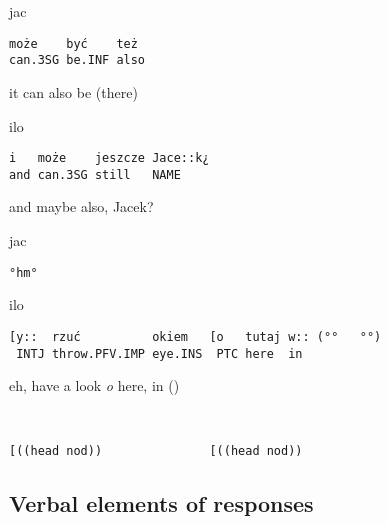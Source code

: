 \documentclass[output=paper]{langsci/langscibook}
\begin{document}
\vspace{2mm}
%
\begin{transbox}{1}{jac}
\begin{verbatim}
może    być    też
can.3SG be.INF also
\end{verbatim}
it can also be (there)
\end{transbox}
%
\begin{mdframednoverticalspace}[style=firstfoc]
\begin{transbox}{2}{ilo}
\begin{verbatim}
i   może    jeszcze Jace::k¿
and can.3SG still   NAME
\end{verbatim}
and maybe also, Jacek?
\end{transbox}
\end{mdframednoverticalspace}
%
%
\begin{transbox}{4}{jac}
\begin{verbatim}
°hm°
\end{verbatim}
\end{transbox}
%
\begin{mdframednoverticalspace}[style=firstfoc]
\begin{transbox}{5}{ilo}
\begin{verbatim}
[y::  rzuć          okiem   [o   tutaj w:: (°°   °°)
 INTJ throw.PFV.IMP eye.INS  PTC here  in
\end{verbatim}
\hspace{0.07cm} eh, have a look \textit{o} here, in (\hspace{1cm})
\end{transbox}
\end{mdframednoverticalspace}
%
\begin{transbox}{6}{~}
\begin{verbatim}
[((head nod))               [((head nod))
\end{verbatim}
\end{transbox}
%
\begin{mdframednoverticalspace}[style=secondfoc]
\end{mdframednoverticalspace}\vspace{-2mm}

\subsection{Verbal elements of responses}
\end{document}
